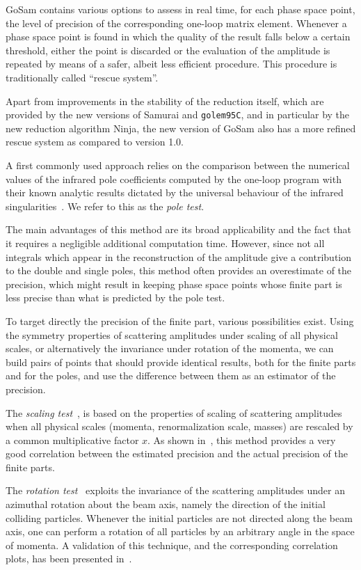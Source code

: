 \documentclass[11pt,a4paper]{refrep}
\newcommand{\gosam}{{\sc GoSam}\xspace}
\newcommand{\golemVC}{{\tt golem95C}\xspace}
\newcommand{\samurai}{{\sc Samurai}\xspace}
\newcommand{\ninja}{{\sc Ninja}\xspace}
\begin{document}
\gosam{} contains various options to assess in real time, for each phase space point, 
the level of precision of the corresponding one-loop matrix element. 
Whenever a phase space point is found in which the quality of the result falls below a
certain threshold, either the point is discarded or the evaluation of the amplitude is
repeated by means of a safer, albeit less efficient procedure. This procedure is
traditionally called ``rescue system''.

Apart from improvements in the stability of the reduction itself, which are provided by the new versions of \samurai{} and \golemVC, and in particular by the new reduction algorithm \ninja,  the new version of \gosam{} also has a more refined rescue system as compared to version 1.0. 

A first commonly used approach relies on the comparison between the numerical values of the
infrared pole coefficients computed by the one-loop program with 
their known analytic results dictated by the universal behaviour of the 
infrared singularities~\cite{Catani:2000ef}. We refer to this as the {\it pole test}. 

The main advantages of this method are its broad applicability and the fact that it requires a negligible additional computation time. However, since not all integrals which appear in the reconstruction of the amplitude give a contribution to the double and single poles, this method often provides an overestimate of the precision, which might result in keeping  phase space points whose finite part is less precise than what is predicted by the pole test.

To target directly the precision of the finite part, various possibilities exist.
Using the symmetry properties of scattering amplitudes under scaling of all physical scales,
 or alternatively the invariance under rotation of the momenta, 
 we can build pairs of points that should provide identical results, 
 both for the finite parts and for the poles, and use the difference between them 
 as an estimator of the precision. 

The {\it scaling test}~\cite{Badger:2010nx}, is based on the properties of scaling of scattering amplitudes when all physical scales (momenta, renormalization scale, masses) are rescaled by a common multiplicative factor $x$. As shown in~\cite{Badger:2010nx}, this method provides a very good correlation between the estimated precision and the actual precision of the finite parts.

The {\it rotation test}~\cite{vanDeurzen:2013saa} exploits the invariance of the scattering amplitudes under an azimuthal rotation about the beam axis, namely the direction of the initial colliding particles. Whenever the initial particles are not directed along the beam axis, one can perform a rotation of all particles by an arbitrary angle in the space of momenta. A validation of this technique, and the corresponding correlation plots, has been presented in~\cite{vanDeurzen:2013saa}.
\end{document}
